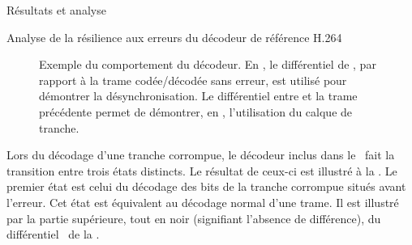 \begin{chapter}{Résultats et analyse}
\begin{section}{Analyse de la résilience aux erreurs du décodeur de référence H.264}
\begin{figure}[htb]
\caption[Exemple du comportement du décodeur]{Exemple du comportement du
décodeur. En , le différentiel de ,
par rapport à la trame codée/décodée sans erreur, est utilisé pour démontrer la
désynchronisation. Le différentiel entre  et la trame
précédente permet de démontrer, en , l'utilisation du calque
de tranche.}
\label{fig-DecoderBehavior}
\end{figure}

Lors du décodage d'une tranche corrompue, le décodeur inclus dans le
\ltCodec~fait la transition entre trois états distincts. Le résultat de ceux-ci
est illustré à la . Le premier état est celui du
décodage des bits de la tranche corrompue situés avant l'erreur. Cet état est
équivalent au décodage normal d'une trame. Il est illustré par la partie
supérieure, tout en noir (signifiant l'absence de différence), du
différentiel~ de la .


\end{section}
\end{chapter}
